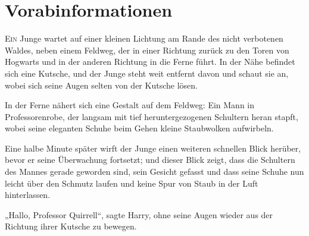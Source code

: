\chapter{Vorabinformationen}

\lettrine{E}{in} Junge wartet auf einer kleinen Lichtung am Rande des nicht verbotenen Waldes, neben einem Feldweg, der in einer Richtung zurück zu den Toren von Hogwarts und in der anderen Richtung in die Ferne führt. In der Nähe befindet sich eine Kutsche, und der Junge steht weit entfernt davon und schaut sie an, wobei sich seine Augen selten von der Kutsche lösen.

In der Ferne nähert sich eine Gestalt auf dem Feldweg: Ein Mann in Professorenrobe, der langsam mit tief heruntergezogenen Schultern heran stapft, wobei seine eleganten Schuhe beim Gehen kleine Staubwolken aufwirbeln.

Eine halbe Minute später wirft der Junge einen weiteren schnellen Blick herüber, bevor er seine Überwachung fortsetzt; und dieser Blick zeigt, dass die Schultern des Mannes gerade geworden sind, sein Gesicht gefasst und dass seine Schuhe nun leicht über den Schmutz laufen und keine Spur von Staub in der Luft hinterlassen.

„Hallo, Professor Quirrell“, sagte Harry, ohne seine Augen wieder aus der Richtung ihrer Kutsche zu bewegen.

